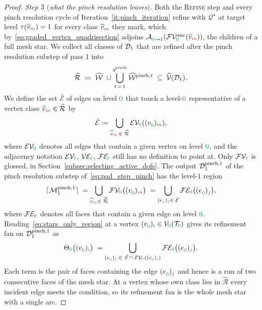 \documentclass[a4paper, 12pt]{article}
\makeatletter
\newcommand{\quadriV}{\mathcal{Q}^{\star}}                       %
\newcommand{\quadriVup}[1]{\quadriV_{\rightarrow #1}}            %
\newcommand{\targetlevel}{\tau}                                 %
\newcommand{\checkit}[1]{{\color{red}#1}}
\newcommand{\green}{\color{ForestGreen}}
\newcommand{\brickred}{\color{BrickRed}}
\newcommand{\T}{\mathcal{T}}
\newcommand{\V}{\mathcal{V}}
\newcommand{\E}{\mathcal{E}}
\newcommand{\F}{\mathcal{F}}
\newcommand{\vertex}[2]{\freeQ{v}{}{#1}{#2}}
\newcommand{\vertexClass}[1]{\widehat{v}_{#1}}
\newcommand{\vertexClasses}{\widehat{\V}}
\DeclareRobustCommand{\markedVertexClasses}[1][]{\widehat{\mathcal{W}}\ifx\@empty#1\@empty\else^{#1}\fi}
\newcommand{\edge}[2]{\freeQ{e}{}{#1}{#2}}
\newcommand{\VEl}[1]{\V\E_{#1}}
\newcommand{\FEl}[1]{\F\E_{#1}}
\newcommand{\EVl}[1]{\E\V_{#1}}
\newcommand{\FVl}[1]{\F\V_{#1}}
\newcommand{\coarseIdxone}{{\brickred i}}
\newcommand{\coarseIdxtwo}{{\brickred m}}
\newcommand{\fineIdxone}{{\brickred j}}
\renewcommand{\l}{{\green\ell}}
\newcommand{\lzero}{{\green 0}}
\newcommand{\R}{\mathcal{R}}
\newcommand{\freeQ}[4]{ ( {#1}^{#2}_{#3} )_{#4}}
\newcommand{\Aop}[3]{\mathcal{A}^{#1}_{{#2} \to {#3}}}
\newcommand{\M}{\mathcal{M}}
\theoremstyle{definition}
\theoremstyle{plain}
\numberwithin{equation}{section}
\newcommand{\tobecut}[1]{{\color{red} #1}}     %
\newcommand{\ancestorPatch}[1]{\lceil #1 \rceil}
\DeclareRobustCommand{\domseq}[1][]{\mathcal{D}\ifx\@empty#1\@empty\else_{#1}\fi}
\newcommand{\refFan}[1]{\Theta_{#1}}                        %
\newcommand{\FVanc}[1]{\F\V^{\mathrm{anc}}_{#1}}            %
\makeatother
\begin{document}
\begin{proof}
    \emph{Step $3$ $($what the pinch resolution leaves$)$.} Both the \textsc{Refine} step and every pinch resolution cycle of Iteration~\ref{it:pinch_iteration} refine with $\quadriV$ at target level $\targetlevel(\vertexClass{\coarseIdxtwo}) = 1$ for every class $\vertexClass{\coarseIdxtwo}$ they mark, which by~\eqref{eq:graded_vertex_quadrisection} adjoins $\Aop{}{\lzero}{1}(\FVanc{\lzero}(\vertexClass{\coarseIdxtwo}))$, the children of a full mesh star. We collect all classes of $\domseq[1]$ that are refined after the pinch resolution substep of pass $1$ into
    \begin{equation}
        \label{eq:stars_only_R}
        \widehat{\R} \; \coloneq \; \markedVertexClasses \; \cup \bigcup\limits_{t \, = \, 1}^{q^{\mathrm{pinch}}} \markedVertexClasses[\mathrm{pinch},t] \; \subseteq \; \vertexClasses(\domseq[1]) .
    \end{equation}
    We define the set $\bar{\E}$ of edges on level $\lzero$ that touch a level-$\lzero$ representative of a vertex class $\vertexClass{\coarseIdxtwo} \in \widehat{\R}$ by
    \begin{equation}
        \label{eq:edges_of_star_set}
        \bar{\E} \coloneq \bigcup\limits_{\vertexClass{\coarseIdxtwo} \, \in \; \widehat{\R}} \EVl{\lzero}(\vertex{\lzero}{\coarseIdxtwo}),
    \end{equation}
    where $\EVl{\lzero}$ denotes all edges that contain a given vertex on level $\lzero$\checkit{, and the adjacency notation $\EVl{\l}$, $\VEl{\l}$, $\FEl{\l}$ still has no definition to point at. Only $\FVl{\l}$ is glossed, in Section~\ref{subsec:selecting_active_dofs}}. The output $\domseq[1]^{\mathrm{pinch},1}$ of the pinch resolution substep of~\eqref{eq:pad_step_pinch} has the level-$1$ region
    \begin{equation}
        \label{eq:stars_only_region}
        \ancestorPatch{\M_1^{\mathrm{pinch},1}} \; = \bigcup\limits_{\vertexClass{\coarseIdxtwo} \in \; \widehat{\R}} \FVl{\lzero} \big( \vertex{\lzero}{\coarseIdxtwo} \big) \; = \bigcup\limits_{\edge{\lzero}{\fineIdxone} \in \; \bar{\E}} \FEl{\lzero} \big( \edge{\lzero}{\fineIdxone} \big),
    \end{equation}
    where $\FEl{\lzero}$ denotes all faces that contain a given edge on level $\lzero$. Reading~\eqref{eq:stars_only_region} at a vertex $\vertex{\lzero}{\coarseIdxone} \in \V_\lzero(\T_\lzero)$ gives its refinement fan on $\domseq[1]^{\mathrm{pinch},1}$ as
    \begin{equation}
        \label{eq:stars_only_fan}
        \refFan{\lzero} \big( \vertex{\lzero}{\coarseIdxone} \big) \; = \bigcup\limits_{\edge{\lzero}{\fineIdxone} \;\in \,\; \bar{\E} \, \cap \; \EVl{\lzero}(\vertex{\lzero}{\coarseIdxone})} \FEl{\lzero} \big( \edge{\lzero}{\fineIdxone} \big).
    \end{equation}
    Each term is the pair of faces containing the edge $\edge{\lzero}{\fineIdxone}$ and hence is a run of two consecutive faces of the mesh star. At a vertex whose own class lies in $\widehat{\R}$ every incident edge meets the condition, so its refinement fan is the whole mesh star with a single arc.


\end{proof}
\end{document}
